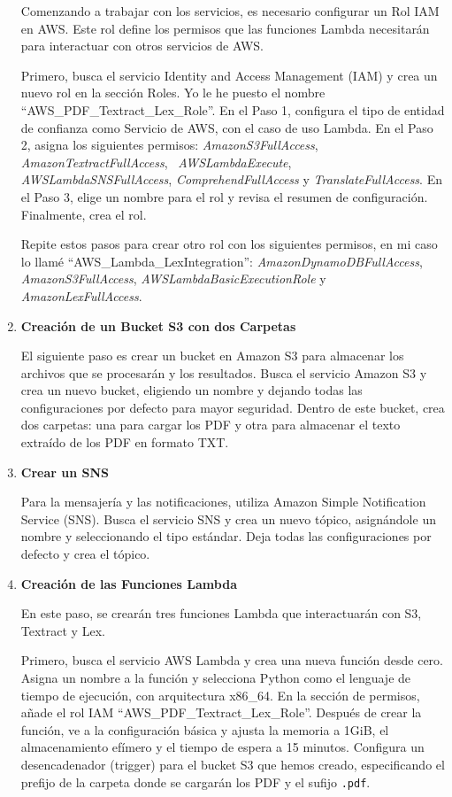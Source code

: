 \begin{enumerate}
Comenzando a trabajar con los servicios, es necesario configurar un Rol IAM en AWS. Este rol define los permisos que las funciones Lambda necesitarán para interactuar con otros servicios de AWS.


Primero, busca el servicio Identity and Access Management (IAM) y crea un nuevo rol en la sección Roles. Yo le he puesto el nombre “AWS\_PDF\_Textract\_Lex\_Role”. En el Paso 1, configura el tipo de entidad de confianza como Servicio de AWS, con el caso de uso Lambda. En el Paso 2, asigna los siguientes permisos: \textit{AmazonS3FullAccess}, \textit{AmazonTextractFullAccess}, \ \textit{AWSLambdaExecute}, \textit{AWSLambdaSNSFullAccess}, \textit{ComprehendFullAccess} y \textit{TranslateFullAccess}. En el Paso 3, elige un nombre para el rol y revisa el resumen de configuración. Finalmente, crea el rol.

Repite estos pasos para crear otro rol con los siguientes permisos, en mi caso lo llamé “AWS\_Lambda\_LexIntegration”: \textit{AmazonDynamoDBFullAccess}, \textit{AmazonS3FullAccess}, \textit{AWSLambdaBasicExecutionRole} y \textit{AmazonLexFullAccess}.

\item \textbf{Creación de un Bucket S3 con dos Carpetas}

El siguiente paso es crear un bucket en Amazon S3 para almacenar los archivos que se procesarán y los resultados. Busca el servicio Amazon S3 y crea un nuevo bucket, eligiendo un nombre y dejando todas las configuraciones por defecto para mayor seguridad. Dentro de este bucket, crea dos carpetas: una para cargar los PDF y otra para almacenar el texto extraído de los PDF en formato TXT.

\item \textbf{Crear un SNS}

Para la mensajería y las notificaciones, utiliza Amazon Simple Notification Service (SNS). Busca el servicio SNS y crea un nuevo tópico, asignándole un nombre y seleccionando el tipo estándar. Deja todas las configuraciones por defecto y crea el tópico.

\item \textbf{Creación de las Funciones Lambda}

En este paso, se crearán tres funciones Lambda que interactuarán con S3, Textract y Lex.

Primero, busca el servicio AWS Lambda y crea una nueva función desde cero. Asigna un nombre a la función y selecciona Python como el lenguaje de tiempo de ejecución, con arquitectura x86\_64. En la sección de permisos, añade el rol IAM “AWS\_PDF\_Textract\_Lex\_Role”. Después de crear la función, ve a la configuración básica y ajusta la memoria a 1GiB, el almacenamiento efímero y el tiempo de espera a 15 minutos. Configura un desencadenador (trigger) para el bucket S3 que hemos creado, especificando el prefijo de la carpeta donde se cargarán los PDF y el sufijo \texttt{.pdf}.


\end{enumerate}
